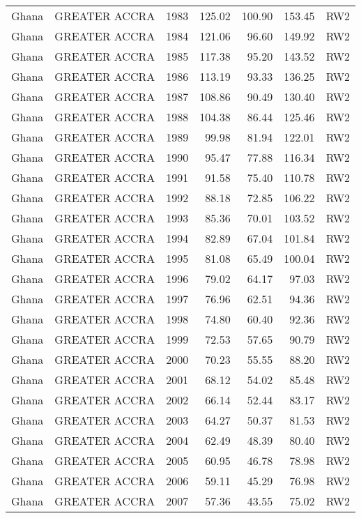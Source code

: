 \begin{longtable}{lllrrrl}
  Ghana & GREATER ACCRA & 1983 & 125.02 & 100.90 & 153.45 & RW2 \\ 
  Ghana & GREATER ACCRA & 1984 & 121.06 & 96.60 & 149.92 & RW2 \\ 
  Ghana & GREATER ACCRA & 1985 & 117.38 & 95.20 & 143.52 & RW2 \\ 
  Ghana & GREATER ACCRA & 1986 & 113.19 & 93.33 & 136.25 & RW2 \\ 
  Ghana & GREATER ACCRA & 1987 & 108.86 & 90.49 & 130.40 & RW2 \\ 
  Ghana & GREATER ACCRA & 1988 & 104.38 & 86.44 & 125.46 & RW2 \\ 
  Ghana & GREATER ACCRA & 1989 & 99.98 & 81.94 & 122.01 & RW2 \\ 
  Ghana & GREATER ACCRA & 1990 & 95.47 & 77.88 & 116.34 & RW2 \\ 
  Ghana & GREATER ACCRA & 1991 & 91.58 & 75.40 & 110.78 & RW2 \\ 
  Ghana & GREATER ACCRA & 1992 & 88.18 & 72.85 & 106.22 & RW2 \\ 
  Ghana & GREATER ACCRA & 1993 & 85.36 & 70.01 & 103.52 & RW2 \\ 
  Ghana & GREATER ACCRA & 1994 & 82.89 & 67.04 & 101.84 & RW2 \\ 
  Ghana & GREATER ACCRA & 1995 & 81.08 & 65.49 & 100.04 & RW2 \\ 
  Ghana & GREATER ACCRA & 1996 & 79.02 & 64.17 & 97.03 & RW2 \\ 
  Ghana & GREATER ACCRA & 1997 & 76.96 & 62.51 & 94.36 & RW2 \\ 
  Ghana & GREATER ACCRA & 1998 & 74.80 & 60.40 & 92.36 & RW2 \\ 
  Ghana & GREATER ACCRA & 1999 & 72.53 & 57.65 & 90.79 & RW2 \\ 
  Ghana & GREATER ACCRA & 2000 & 70.23 & 55.55 & 88.20 & RW2 \\ 
  Ghana & GREATER ACCRA & 2001 & 68.12 & 54.02 & 85.48 & RW2 \\ 
  Ghana & GREATER ACCRA & 2002 & 66.14 & 52.44 & 83.17 & RW2 \\ 
  Ghana & GREATER ACCRA & 2003 & 64.27 & 50.37 & 81.53 & RW2 \\ 
  Ghana & GREATER ACCRA & 2004 & 62.49 & 48.39 & 80.40 & RW2 \\ 
  Ghana & GREATER ACCRA & 2005 & 60.95 & 46.78 & 78.98 & RW2 \\ 
  Ghana & GREATER ACCRA & 2006 & 59.11 & 45.29 & 76.98 & RW2 \\ 
  Ghana & GREATER ACCRA & 2007 & 57.36 & 43.55 & 75.02 & RW2 \\ 

\end{longtable}
